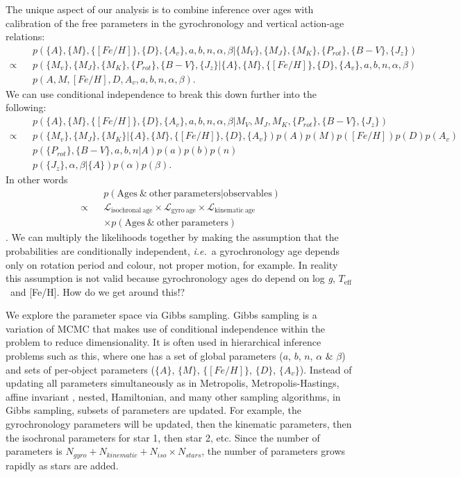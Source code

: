 \documentclass[useAMS, usenatbib, preprint, 12pt]{aastex}
\newcommand{\racomment}[1]{{\color{red}#1}}
\newcommand{\teff}{$T_{\mathrm{eff}}$}
\newcommand{\feh}{[Fe/H]}
\newcommand{\logg}{log \emph{g}}
\newcommand{\ie}{{\it i.e.}}
\begin{document}
The unique aspect of our analysis is to combine inference over ages with
calibration of the free parameters in the gyrochronology and vertical
action-age relations:
\begin{eqnarray}
    &&p(\{A\}, \{M\}, \{[Fe/H]\}, \{D\}, \{A_v\}, a, b, n, \alpha, \beta|
    \{M_V\}, \{M_J\}, \{M_K\}, \{P_{rot}\}, \{B-V\}, \{J_z\}) \\ \nonumber
    \propto &&p(\{M_v\}, \{M_J\}, \{M_K\}, \{P_{rot}\},
    \{B-V\}, \{J_z\} | \{A\}, \{M\}, \{[Fe/H]\}, \{D\}, \{A_v\}, a, b, n,
    \alpha, \beta) \\ \nonumber
    &&p(A, M, [Fe/H], D, A_v, a, b, n, \alpha, \beta).
\end{eqnarray}
We can use conditional independence to break this down further into the
following:
\begin{eqnarray}
    &&p(\{A\}, \{M\}, \{[Fe/H]\}, \{D\}, \{A_v\}, a, b, n, \alpha, \beta|
    M_V, M_J, M_K,
    \{P_{rot}\}, \{B-V\}, \{J_z\}) \\  \nonumber
    \propto &&p(\{M_v\}, \{M_J\}, \{M_K\} | \{A\}, \{M\}, \{[Fe/H]\}, \{D\},
    \{A_v\})
    p(A)p(M)p([Fe/H])p(D)p(A_v) \\ \nonumber
    &&p(\{P_{rot}\}, \{B-V\}, a, b, n | A)p(a)p(b)p(n) \\ \nonumber
    &&p(\{J_z\}, \alpha, \beta | \{A\}) p(\alpha)p(\beta).
\end{eqnarray}
In other words
\begin{eqnarray}
    &&p(\mathrm{Ages~\&~other~parameters}|\mathrm{observables}) \\
    \propto &&\mathcal{L}_{\mathrm{isochronal~age}} \times
    \mathcal{L}_{\mathrm{gyro~age}} \times
    \mathcal{L}_{\mathrm{kinematic~age}} \\
    && \times p(\mathrm{Ages~\&~other~parameters})
\end{eqnarray}.
We can multiply the likelihoods together by making the assumption that the
probabilities are conditionally independent, \ie\ a gyrochronology age depends
only on rotation period and colour, not proper motion, for example.
In reality this assumption is not valid because gyrochronology ages do depend
on \logg, \teff\ and \feh.
\racomment{How do we get around this!?}

We explore the parameter space via Gibbs sampling.
Gibbs sampling is a variation of MCMC that makes use of conditional
independence within the problem to reduce dimensionality.
It is often used in hierarchical inference problems such as this, where one
has a set of global parameters ($a$, $b$, $n$, $\alpha$ \& $\beta$) and sets
of per-object parameters ($\{A\}$, $\{M\}$, $\{[Fe/H]\}$, $\{D\}$, $\{A_v\}$).
Instead of updating all parameters simultaneously as in Metropolis,
Metropolis-Hastings, affine invariant \citep{Goodman2010}, nested, Hamiltonian,
and many other sampling algorithms, in Gibbs sampling, subsets of parameters
are updated.
For example, the gyrochronology parameters will be updated, then the kinematic
parameters, then the isochronal parameters for star 1, then star 2, etc.
Since the number of parameters is $N_{gyro} + N_{kinematic} + N_{iso} \times
N_{stars}$, the number of parameters grows rapidly as stars are added.
\end{document}

